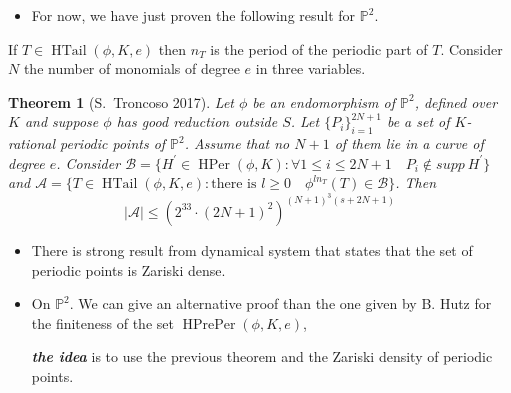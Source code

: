 \documentclass{beamer}
\def\PP{{\mathbb P}}
\DeclareMathOperator{\HTail}{HTail}
\DeclareMathOperator{\HPer}{HPer}
\DeclareMathOperator{\HPrePer}{HPrePer}
\theoremstyle{thmstyle}
\theoremstyle{thmstyle}
\newtheorem*{mythm}{Theorem}
\theoremstyle{mystyle}
\theoremstyle{qstnstyle}
\begin{document}
\begin{frame}
\begin{itemize}
\item For now, we have just proven the following result for $\PP^2$.
\end{itemize}
 
If $T \in \HTail(\phi,K, e)$ then $n_T$ is the period of the periodic part of $T$. Consider $N$ the number of monomials of degree $e$ in three variables.  

\begin{mythm}[S.\ Troncoso 2017]
Let $\phi$ be an endomorphism of $\PP^2$, defined over $K$ and suppose $\phi$ has good reduction outside $S$. Let $\{P_i\}_{i=1}^{2N+1} $ be a set of $K$-rational periodic points of $\PP^2$. Assume that no $N+1$ of them lie in a curve of degree $e$. Consider $\mathcal{B} =\{ H^{\prime} \in \HPer(\phi,K) \colon \forall  1 \leq i \leq 2N+1 \quad P_i \notin  supp\ H^{\prime}     \} $ and $\mathcal{A}=\{ T \in \HTail(\phi,K, e) \colon \mbox{there is } l\geq 0 \quad \phi^{ln_T}(T) \in \mathcal{B}   \}$.  Then
 $$ |\mathcal{A} | \leq \left(2^{33} \cdot (2N+1)^2\right)^{\left(N+1\right)^3(s+2N+1)}  $$
\end{mythm}


\end{frame}

\begin{frame}
\begin{itemize}

\item  There is strong result from dynamical system that states that the set of periodic points is Zariski dense.

 

\item On $\PP^2$. We can give an alternative proof than the one given by B. Hutz for the finiteness of the set $\HPrePer(\phi,K,e)$, 

\textbf{\emph{the idea}} is to use the previous theorem and the Zariski density of periodic points.
\end{itemize}
\end{frame}
\end{document}
